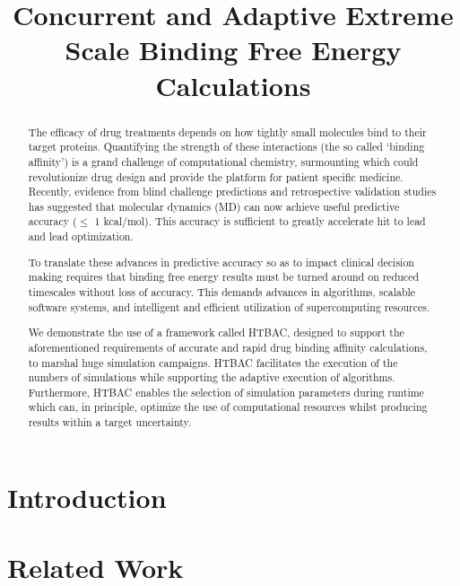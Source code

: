 \documentclass[conference]{IEEEtran}
\title{Concurrent and Adaptive Extreme Scale Binding Free Energy Calculations}
\author{
\IEEEauthorblockN{}
\IEEEauthorblockA{RADICAL Laboratory, Electric and Computer Engineering,
                    Rutgers University, New Brunswick, NJ, USA}
}
\begin{document}
\maketitle

\begin{abstract}
The efficacy of drug treatments depends on how tightly small molecules bind to
their target proteins. Quantifying the strength of these interactions (the so
called ‘binding affinity’) is a grand challenge of computational chemistry,
surmounting which could revolutionize drug design and provide the platform for
patient specific medicine. Recently, evidence from blind challenge predictions
and retrospective validation studies has suggested that molecular dynamics
(MD) can now achieve useful predictive accuracy ($\leq$ 1 kcal/mol).
This accuracy is sufficient to greatly accelerate hit to lead and lead optimization.

To translate these advances in predictive accuracy so as to impact clinical
decision making requires that binding free energy results
must be turned around on reduced timescales without loss of accuracy. This
demands advances in algorithms, scalable software systems, and intelligent and
efficient utilization of supercomputing resources. 


We demonstrate the use of a framework called HTBAC, designed to support
the aforementioned requirements of accurate and rapid drug binding affinity
calculations, to marshal huge simulation campaigns. HTBAC facilitates the 
execution of the numbers of simulations while supporting the adaptive execution 
of algorithms. Furthermore, HTBAC enables the selection of simulation parameters 
during runtime which can, in principle, optimize the use of computational 
resources whilst producing results within a target uncertainty.
\end{abstract}

\section{Introduction}


%

\section{Related Work}
\label{sec:related-work}

\end{document}
